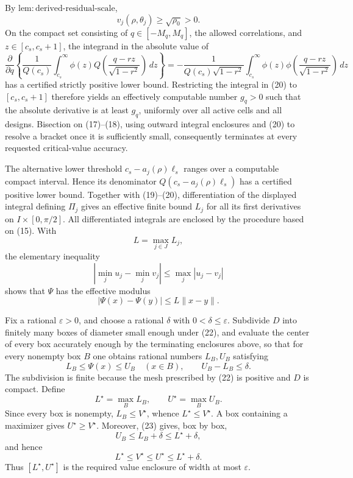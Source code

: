 By \(\mathrm{lem{:}derived\mbox{-}residual\mbox{-}scale}\),
\[
v_j(\rho,\theta_j)\geq\sqrt{\rho_0}>0.                            \tag{19}
\]
On the compact set consisting of \(q\in[-M_q,M_q]\), the allowed correlations, and \(z\in[c_s,c_s+1]\), the integrand in the absolute value of
\[
\frac{\partial}{\partial q}
\left\{
 \frac{1}{Q(c_s)}\int_{c_s}^{\infty}
 \phi(z)Q\!\left(\frac{q-rz}{\sqrt{1-r^2}}\right)\,dz
\right\}
=-\frac{1}{Q(c_s)\sqrt{1-r^2}}
 \int_{c_s}^{\infty}\phi(z)
 \phi\!\left(\frac{q-rz}{\sqrt{1-r^2}}\right)\,dz               \tag{20}
\]
has a certified strictly positive lower bound.  Restricting the integral in (20) to \([c_s,c_s+1]\) therefore yields an effectively computable number \(g_q>0\) such that the absolute derivative is at least \(g_q\), uniformly over all active cells and all designs.  Bisection on (17)--(18), using outward integral enclosures and (20) to resolve a bracket once it is sufficiently small, consequently terminates at every requested critical-value accuracy.

The alternative lower threshold \(c_s-a_j(\rho)\ell_s\) ranges over a computable compact interval.  Hence its denominator \(Q(c_s-a_j(\rho)\ell_s)\) has a certified positive lower bound.  Together with (19)--(20), differentiation of the displayed integral defining \(\Pi_j\) gives an effective finite bound \(L_j\) for all its first derivatives on \(I\times[0,\pi/2]\).  All differentiated integrals are enclosed by the procedure based on (15).  With
\[
L=\max_{j\in J}L_j,
\]
the elementary inequality
\[
\left|\min_j u_j-\min_j v_j\right|
\leq\max_j|u_j-v_j|                                                \tag{21}
\]
shows that \(\Psi\) has the effective modulus
\[
|\Psi(x)-\Psi(y)|\leq L\lVert x-y\rVert.                          \tag{22}
\]

Fix a rational \(\varepsilon>0\), and choose a rational \(\delta\) with \(0<\delta\leq\varepsilon\).  Subdivide \(D\) into finitely many boxes of diameter small enough under (22), and evaluate the center of every box accurately enough by the terminating enclosures above, so that for every nonempty box \(B\) one obtains rational numbers \(L_B,U_B\) satisfying
\[
L_B\leq\Psi(x)\leq U_B\quad(x\in B),
\qquad U_B-L_B\leq\delta.                                        \tag{23}
\]
The subdivision is finite because the mesh prescribed by (22) is positive and \(D\) is compact.  Define
\[
L^{\star}=\max_B L_B,
\qquad U^{\star}=\max_B U_B.                                     \tag{24}
\]
Since every box is nonempty, \(L_B\leq V^{\star}\), whence \(L^{\star}\leq V^{\star}\).  A box containing a maximizer gives \(U^{\star}\geq V^{\star}\).  Moreover, (23) gives, box by box,
\[
U_B\leq L_B+\delta\leq L^{\star}+\delta,
\]
and hence
\[
L^{\star}\leq V^{\star}\leq U^{\star}
\leq L^{\star}+\delta.                                           \tag{25}
\]
Thus \([L^{\star},U^{\star}]\) is the required value enclosure of width at most \(\varepsilon\).

